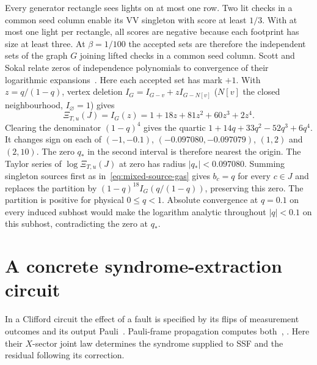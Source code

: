 \documentclass[10pt,twocolumn]{article}
\theoremstyle{definition}
\begin{document}
Every generator rectangle sees lights on at most one row. Two lit checks
in a common seed column enable its VV singleton with score at least
$1/3$. With at most one light per rectangle, all scores are negative
because each footprint has size at least three. At $\beta=1/100$ the
accepted sets are therefore the independent sets of the graph $G$
joining lifted checks in a common seed column. Scott and Sokal relate
zeros of independence polynomials to convergence of their logarithmic
expansions~\cite{ScottSokal05}. Here each accepted set has mark $+1$.
With $z=q/(1-q)$, vertex deletion
$I_G=I_{G-v}+zI_{G-N[v]}$ ($N[v]$ the closed neighbourhood,
$I_{\varnothing}=1$) gives
\[
 \Xi_{T,u}(J)=I_G(z)=1+18z+81z^2+60z^3+2z^4 .
\]
Clearing the denominator $(1-q)^4$ gives the quartic
$1+14q+33q^2-52q^3+6q^4$. It changes sign on each of $(-1,-0.1)$,
$(-0.097080,-0.097079)$, $(1,2)$ and $(2,10)$. The zero $q_*$ in
the second interval is therefore nearest the origin.
The Taylor series of $\log\Xi_{T,u}(J)$ at zero
has radius $|q_*|<0.097080$. Summing singleton sources first as
in~\eqref{eq:mixed-source-gas} gives $b_c=q$ for every $c\in J$ and replaces
the partition by $(1-q)^{18}I_G(q/(1-q))$, preserving this zero.
The partition is positive for physical $0\le q<1$. Absolute convergence
at $q=0.1$ on every induced subhost would make the logarithm analytic
throughout $|q|<0.1$ on this subhost, contradicting the zero at $q_*$.

\section{A concrete syndrome-extraction circuit}\label{app:circuit}

In a Clifford circuit the effect of a fault is specified by its flips
of measurement outcomes and its output Pauli~\cite[Prop.~1]{DP23}.
Pauli-frame propagation computes both~\cite[Chap.~5]{Gott97},
\cite[Secs.~2.4--3]{Gidney21}. Here their $X$-sector joint law determines
the syndrome supplied to SSF and the residual following its correction.
\end{document}
